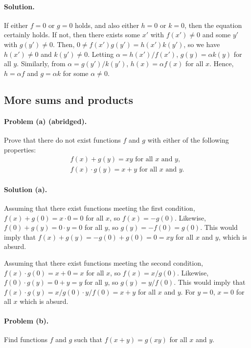 \documentclass{article}
\begin{document}
\paragraph{Solution.} If either $f = 0$ or $g = 0$ holds, and also either $h = 0$ or $k = 0$, then the equation certainly holds. If not, then there exists some $x'$ with $f(x') \neq 0$ and some $y'$ with $g(y') \neq 0$. Then, $0 \neq f(x')g(y') = h(x')k(y')$, so we have $h(x') \neq 0$ and $k(y') \neq 0$. Letting $\alpha = h(x')/f(x')$, $g(y) = \alpha k(y)$ for all $y$. Similarly, from $\alpha = g(y')/k(y')$, $h(x) = \alpha f(x)$ for all $x$. Hence, $h = \alpha f$ and $g = \alpha k$ for some $\alpha \neq 0$.

\setcounter{subsection}{18}
\subsection{More sums and products}

\paragraph{Problem (a) (abridged).} Prove that there do not exist functions $f$ and $g$ with either of the following properties: \begin{align*}
  f(x) + g(y) = xy \text{ for all } x \text{ and } y, \\
  f(x) \cdot g(y) = x + y \text{ for all } x \text{ and } y.
\end{align*}

\paragraph{Solution (a).} Assuming that there exist functions meeting the first condition, $f(x) + g(0) = x \cdot 0 = 0$ for all $x$, so $f(x) = -g(0)$. Likewise, $f(0) + g(y) = 0 \cdot y = 0$ for all $y$, so $g(y) = -f(0) = g(0)$. This would imply that $f(x) + g(y) = -g(0) + g(0) = 0 = xy$ for all $x$ and $y$, which is absurd.

Assuming that there exist functions meeting the second condition, $f(x) \cdot g(0) = x + 0 = x$ for all $x$, so $f(x) = x/g(0)$. Likewise, $f(0) \cdot g(y) = 0 + y = y$ for all $y$, so $g(y) = y/f(0)$. This would imply that $f(x) \cdot g(y) = x/g(0) \cdot y/f(0) = x + y$ for all $x$ and $y$. For $y = 0$, $x = 0$ for all $x$ which is absurd.

\paragraph{Problem (b).} Find functions $f$ and $g$ such that $f(x + y) = g(xy)$ for all $x$ and $y$.
\end{document}
